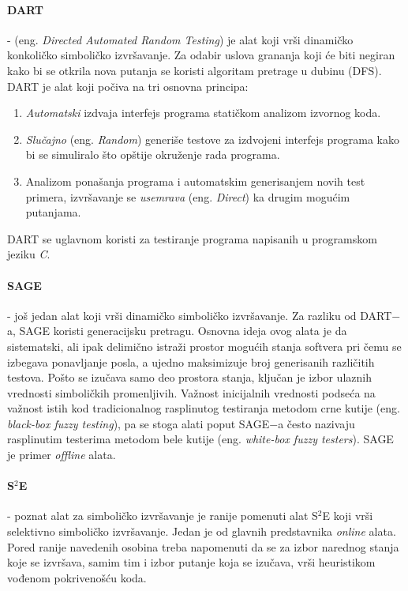 \documentclass[12pt,oneside]{memoir}
\begin{document}
\paragraph{DART} \cite{dart} - (eng. \textit{Directed Automated Random Testing}) je alat koji vrši dinamičko konkoličko simboličko izvršavanje. Za odabir uslova grananja koji će biti negiran kako bi se otkrila nova putanja se koristi algoritam pretrage u dubinu (DFS). DART je alat koji počiva na tri osnovna principa:
\begin{enumerate}
    \item\textit{Automatski} izdvaja interfejs programa statičkom analizom izvornog koda.
    
    \item\textit{Slučajno} (eng. \textit{Random}) generiše testove za izdvojeni interfejs programa kako bi se simuliralo što opštije okruženje rada programa.
    
    \item Analizom ponašanja programa i automatskim generisanjem novih test primera, izvršavanje se \textit{usemrava} (eng. \textit{Direct}) ka drugim mogućim putanjama.
\end{enumerate}

\noindent DART se uglavnom koristi za testiranje programa napisanih u programskom jeziku \textit{C}.

\paragraph{SAGE} \cite{sage} - još jedan alat koji vrši dinamičko simboličko izvršavanje. Za razliku od DART$-$a, SAGE koristi generacijsku pretragu. Osnovna ideja ovog alata je da sistematski, ali ipak delimično istraži prostor mogućih stanja softvera pri čemu se izbegava ponavljanje posla, a ujedno maksimizuje broj generisanih različitih testova. Pošto se izučava samo deo prostora stanja, ključan je izbor ulaznih vrednosti simboličkih promenljivih. Važnost inicijalnih vrednosti podseća na važnost istih kod tradicionalnog rasplinutog testiranja metodom crne kutije (eng. \textit{black-box fuzzy testing}), pa se stoga alati poput SAGE$-$a često nazivaju rasplinutim testerima metodom bele kutije (eng. \textit{white-box fuzzy testers}). SAGE je primer \textit{offline} alata. 

\paragraph{S$^2$E} \cite{s2e} - poznat alat za simboličko izvršavanje je ranije pomenuti alat S$^2$E koji vrši selektivno simboličko izvršavanje. Jedan je od glavnih predstavnika \textit{online} alata. Pored ranije navedenih osobina treba napomenuti da se za izbor narednog stanja koje se izvršava, samim tim i izbor putanje koja se izučava, vrši heuristikom vođenom pokrivenošću koda. 
\end{document}
